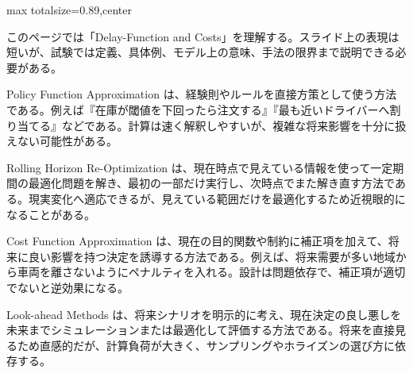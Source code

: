 \begin{minipage}[t]{0.58\textwidth}
\begin{adjustbox}{max totalsize={\textwidth}{0.89\textheight},center}
\begin{minipage}{\textwidth}\scriptsize
{}このページでは「Delay-Function and Costs」を理解する。スライド上の表現は短いが、試験では定義、具体例、モデル上の意味、手法の限界まで説明できる必要がある。\par
Policy Function Approximation は、経験則やルールを直接方策として使う方法である。例えば『在庫が閾値を下回ったら注文する』『最も近いドライバーへ割り当てる』などである。計算は速く解釈しやすいが、複雑な将来影響を十分に扱えない可能性がある。\par
Rolling Horizon Re-Optimization は、現在時点で見えている情報を使って一定期間の最適化問題を解き、最初の一部だけ実行し、次時点でまた解き直す方法である。現実変化へ適応できるが、見えている範囲だけを最適化するため近視眼的になることがある。\par
Cost Function Approximation は、現在の目的関数や制約に補正項を加えて、将来に良い影響を持つ決定を誘導する方法である。例えば、将来需要が多い地域から車両を離さないようにペナルティを入れる。設計は問題依存で、補正項が適切でないと逆効果になる。\par
Look-ahead Methods は、将来シナリオを明示的に考え、現在決定の良し悪しを未来までシミュレーションまたは最適化して評価する方法である。将来を直接見るため直感的だが、計算負荷が大きく、サンプリングやホライズンの選び方に依存する。\par

\end{minipage}
\end{adjustbox}
\end{minipage}
